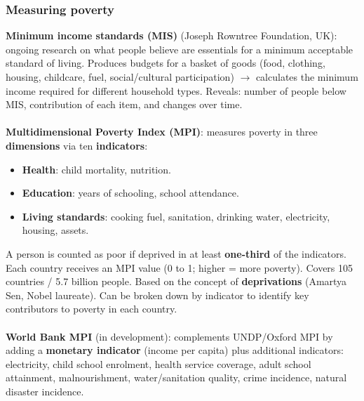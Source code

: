 \subsubsection*{Measuring poverty}
\textbf{Minimum income standards (MIS)} (Joseph Rowntree Foundation, UK): ongoing research on what people believe are essentials for a minimum acceptable standard of living. Produces budgets for a basket of goods (food, clothing, housing, childcare, fuel, social/cultural participation) $\to$ calculates the minimum income required for different household types. Reveals: number of people below MIS, contribution of each item, and changes over time.
\\\\
\textbf{Multidimensional Poverty Index (MPI)}: measures poverty in three \textbf{dimensions} via ten \textbf{indicators}:
\begin{itemize}
  \item \textbf{Health}: child mortality, nutrition.
  \item \textbf{Education}: years of schooling, school attendance.
  \item \textbf{Living standards}: cooking fuel, sanitation, drinking water, electricity, housing, assets.
\end{itemize}
A person is counted as poor if deprived in at least \textbf{one-third} of the indicators. Each country receives an MPI value (0 to 1; higher = more poverty). Covers 105 countries / 5.7 billion people. Based on the concept of \textbf{deprivations} (Amartya Sen, Nobel laureate). Can be broken down by indicator to identify key contributors to poverty in each country.
\\\\
\textbf{World Bank MPI} (in development): complements UNDP/Oxford MPI by adding a \textbf{monetary indicator} (income per capita) plus additional indicators: electricity, child school enrolment, health service coverage, adult school attainment, malnourishment, water/sanitation quality, crime incidence, natural disaster incidence.


